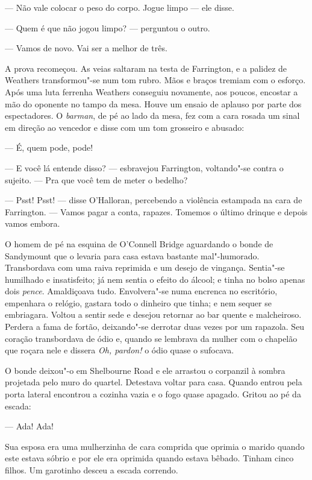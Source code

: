 --- Não vale colocar o peso do corpo.  Jogue limpo --- ele disse.

--- Quem é que não jogou limpo? --- perguntou o outro.

--- Vamos de novo.  Vai ser a melhor de três.

A prova recomeçou.  As veias saltaram na testa de Farrington, e a palidez de
Weathers transformou"-se num tom rubro.  Mãos e braços tremiam com o esforço.
Após uma luta ferrenha Weathers conseguiu novamente, aos poucos, encostar a mão
do oponente no tampo da mesa.  Houve um ensaio de aplauso por parte dos
espectadores.  O \textit{barman}, de pé ao lado da mesa, fez com a cara rosada
um sinal em direção ao vencedor e disse com um tom grosseiro e abusado:

--- É, quem pode, pode!

--- E você lá entende disso? --- esbravejou Farrington, voltando"-se contra o
sujeito.  --- Pra que você tem de meter o bedelho?

--- Psst! Psst! --- disse O’Halloran, percebendo a violência estampada na cara
de Farrington.  --- Vamos pagar a conta, rapazes.  Tomemos o último drinque e
depois vamos embora.

\smallskip

\noindent\dotfill

\smallskip

O homem de pé na esquina de O’Connell Bridge aguardando o bonde de Sandymount
que o levaria para casa estava bastante mal"-humorado.  Transbordava com uma
raiva reprimida e um desejo de vingança.  Sentia"-se humilhado e insatisfeito;
já nem sentia o efeito do álcool; e tinha no bolso apenas dois \textit{pence}.
Amaldiçoava tudo.  Envolvera"-se numa encrenca no escritório, empenhara o
relógio, gastara todo o dinheiro que tinha; e nem sequer se embriagara.  Voltou
a sentir sede e desejou retornar ao bar quente e malcheiroso.  Perdera a fama
de fortão, deixando"-se derrotar duas vezes por um rapazola.  Seu coração
transbordava de ódio e, quando se lembrava da mulher com o chapelão que roçara
nele e dissera \textit{Oh, pardon!} o ódio quase o sufocava.

O bonde deixou"-o em Shelbourne Road e ele arrastou o corpanzil à sombra
projetada pelo muro do quartel.  Detestava voltar para casa.  Quando entrou
pela porta lateral encontrou a cozinha vazia e o fogo quase apagado.  Gritou ao
pé da escada:

--- Ada!  Ada!

Sua esposa era uma mulherzinha de cara comprida que oprimia o marido quando
este estava sóbrio e por ele era oprimida quando estava bêbado.  Tinham cinco
filhos.  Um garotinho desceu a escada correndo.

